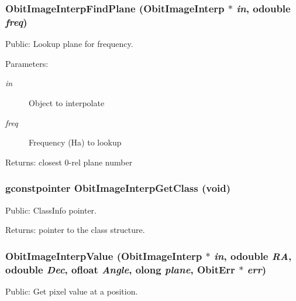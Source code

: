 \subsubsection{ Obit\-Image\-Interp\-Find\-Plane ({\bf Obit\-Image\-Interp} $\ast$ {\em in}, {\bf odouble} {\em freq})}\label{ObitImageInterp_8h_a16}


Public: Lookup plane for frequency. 

\begin{Desc}
\item[Parameters:]
\begin{description}
\item[{\em in}]Object to interpolate \item[{\em freq}]Frequency (Ha) to lookup \end{description}
\end{Desc}
\begin{Desc}
\item[Returns:]closest 0-rel plane number \end{Desc}
\subsubsection{\setlength{\rightskip}{0pt plus 5cm}gconstpointer Obit\-Image\-Interp\-Get\-Class (void)}\label{ObitImageInterp_8h_a10}


Public: Class\-Info pointer. 

\begin{Desc}
\item[Returns:]pointer to the class structure. \end{Desc}
\subsubsection{ Obit\-Image\-Interp\-Value ({\bf Obit\-Image\-Interp} $\ast$ {\em in}, {\bf odouble} {\em RA}, {\bf odouble} {\em Dec}, {\bf ofloat} {\em Angle}, {\bf olong} {\em plane}, {\bf Obit\-Err} $\ast$ {\em err})}\label{ObitImageInterp_8h_a14}


Public: Get pixel value at a position. 

